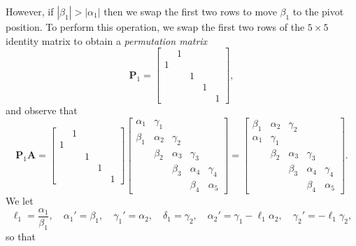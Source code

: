 However, if $|\beta_1|>|\alpha_1|$ then we swap the first two rows to move 
$\beta_1$ to the pivot position.  To perform this operation, we swap the first 
two rows of the $5\times5$ identity matrix to obtain a \emph{permutation matrix}
\[
\boldsymbol{P}_1=\begin{bmatrix}
 &1& & &\\
1& & & &\\
 & &1& &\\
 & & &1&\\
 & & & &1
\end{bmatrix},
\]
and observe that
\[
\boldsymbol{P}_1\boldsymbol{A}=
\begin{bmatrix}
 &1& & &\\
1& & & &\\
 & &1& &\\
 & & &1&\\
 & & & &1
\end{bmatrix}
\begin{bmatrix}
\alpha_1&\gamma_1&        &        &\\
 \beta_1&\alpha_2&\gamma_2&        &\\
        & \beta_2&\alpha_3&\gamma_3&\\
        &        & \beta_3&\alpha_4&\gamma_4\\
        &        &        & \beta_4&\alpha_5
\end{bmatrix}
=\begin{bmatrix}
 \beta_1&\alpha_2&\gamma_2&        &\\
\alpha_1&\gamma_1&        &        &\\
        & \beta_2&\alpha_3&\gamma_3&\\
        &        & \beta_3&\alpha_4&\gamma_4\\
        &        &        & \beta_4&\alpha_5
\end{bmatrix}.
\]
We let
\[
\ell_1=\frac{\alpha_1}{\beta_1},\quad
\alpha_1'=\beta_1,\quad\gamma_1'=\alpha_2,\quad\delta_1=\gamma_2,\quad
\alpha_2'=\gamma_1-\ell_1\alpha_2,\quad\gamma_2'=-\ell_1\gamma_2,
\]
so that

